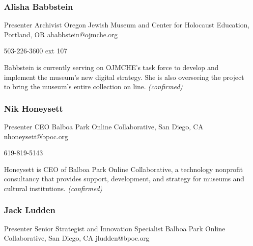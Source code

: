 \documentclass{report}
\begin{document}
                \subsubsection*{ Alisha Babbstein }
                Presenter\newline
                Archivist\newline
                Oregon Jewish Museum and Center for Holocaust Education, Portland, OR 
                \newline
                ababbstein@ojmche.org\newline
                
                503-226-3600 ext 107\newline

                Babbstein is currently serving on OJMCHE's task force to develop and implement the museum's new digital strategy. She is also overseeing the project to bring the museum's entire collection on line.
                \emph{ (confirmed) }
              

              
                \subsubsection*{ Nik Honeysett }
                Presenter\newline
                CEO\newline
                Balboa Park Online Collaborative, San Diego, CA
                \newline
                nhoneysett@bpoc.org\newline
                
                619-819-5143 \newline

                Honeysett is CEO of Balboa Park Online Collaborative, a technology nonprofit consultancy that provides support, development, and strategy for museums and cultural institutions.
                \emph{ (confirmed) }
              

              
                \subsubsection*{ Jack Ludden }
                Presenter\newline
                Senior Strategist and Innovation Specialist\newline
                Balboa Park Online Collaborative, San Diego, CA
                \newline
                jludden@bpoc.org\newline
                
\end{document}
